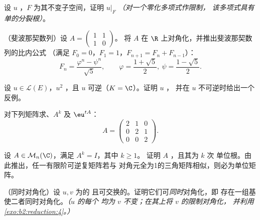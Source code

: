 \begin{exercise}[$\star\star$]\label{exo:b2:reduction:4}
设 $u$ ，$F$ 为其不变子空间，证明
$u|_F$ \emph{（对一个零化多项式作限制，
该多项式具有单的分裂根）}。
\end{exercise}

\begin{exercise}[$\star\star$]\label{exo:b2:reduction:5}
（斐波那契数列）设 $A = \begin{pmatrix} 1 & 1\\ 1 & 0\end{pmatrix}$。
将 $A$ 在 $\R$ 上对角化，并推出斐波那契数列的比内公式
（满足 $F_0 = 0$，$F_1 = 1$，$F_{n+1} = F_n +
F_{n-1}$）：
\[
F_n = \frac{\varphi^n - \psi^n}{\sqrt 5},
\qquad \varphi = \frac{1 + \sqrt5}{2},\ \psi = \frac{1 -
\sqrt5}{2}.
\]
\end{exercise}

\begin{exercise}[$\star\star$]\label{exo:b2:reduction:6}
设 $u \in \mathcal{L}(E)$，$u^2$ ，且 $u$
可逆（$K = \C$）。证明 $u$ ，
并在 $u$ 不可逆时给出一个反例。
\end{exercise}

\begin{exercise}[$\star\star$]\label{exo:b2:reduction:7}
对下列矩阵求、$A^k$ 及 $\eu^{tA}$：
\[
A = \begin{pmatrix} 2 & 1 & 0\\ 0 & 2 & 1\\ 0 & 0 & 2
\end{pmatrix}.
\]
\end{exercise}

\begin{exercise}[$\star\star$]\label{exo:b2:reduction:8}
设 $A \in \mathcal{M}_n(\C)$，满足 $A^k = I$，其中 $k \geq 1$。
证明 $A$ ，且其为 $k$ 次
单位根。由此推出，任一有限阶可逆复矩阵若与
对角元全为1的三角矩阵相似，则必为单位矩阵。
\end{exercise}

\begin{exercise}[$\star\star\star$]\label{exo:b2:reduction:9}
（同时对角化）设 $u, v$ 为的
且可交换的。证明它们可\emph{同时}对角化，即
存在一组基使二者同时对角化。\emph{（$u$ 的每个
均为 $v$ 不变；在其上将 $v$ 的限制对角化，
并利用\cref{exo:b2:reduction:4}。）}
\end{exercise}

